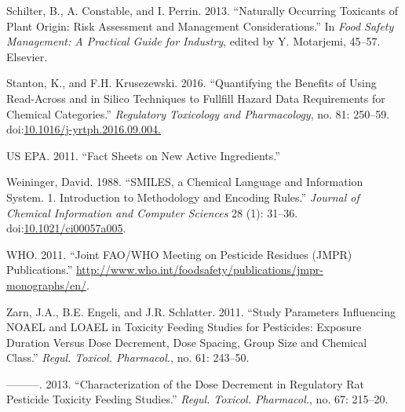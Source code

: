 \documentclass[]{achemso}
\begin{document}
\hypertarget{ref-Schilter2013}{}
Schilter, B., A. Constable, and I. Perrin. 2013. ``Naturally Occurring
Toxicants of Plant Origin: Risk Assessment and Management
Considerations.'' In \emph{Food Safety Management: A Practical Guide for
Industry}, edited by Y. Motarjemi, 45--57. Elsevier.

\hypertarget{ref-Stanton2016}{}
Stanton, K., and F.H. Krusezewski. 2016. ``Quantifying the Benefits of
Using Read-Across and in Silico Techniques to Fullfill Hazard Data
Requirements for Chemical Categories.'' \emph{Regulatory Toxicology and
Pharmacology}, no. 81: 250--59.
doi:\href{https://doi.org/10.1016/j-yrtph.2016.09.004.}{10.1016/j-yrtph.2016.09.004.}

\hypertarget{ref-EPA2011}{}
US EPA. 2011. ``Fact Sheets on New Active Ingredients.''

\hypertarget{ref-doi:10.1021ux2fci00057a005}{}
Weininger, David. 1988. ``SMILES, a Chemical Language and Information
System. 1. Introduction to Methodology and Encoding Rules.''
\emph{Journal of Chemical Information and Computer Sciences} 28 (1):
31--36.
doi:\href{https://doi.org/10.1021/ci00057a005}{10.1021/ci00057a005}.

\hypertarget{ref-WHO2011}{}
WHO. 2011. ``Joint FAO/WHO Meeting on Pesticide Residues (JMPR)
Publications.''
\url{http://www.who.int/foodsafety/publications/jmpr-monographs/en/}.

\hypertarget{ref-Zarn2011}{}
Zarn, J.A., B.E. Engeli, and J.R. Schlatter. 2011. ``Study Parameters
Influencing NOAEL and LOAEL in Toxicity Feeding Studies for Pesticides:
Exposure Duration Versus Dose Decrement, Dose Spacing, Group Size and
Chemical Class.'' \emph{Regul. Toxicol. Pharmacol.}, no. 61: 243--50.

\hypertarget{ref-Zarn2013}{}
---------. 2013. ``Characterization of the Dose Decrement in Regulatory
Rat Pesticide Toxicity Feeding Studies.'' \emph{Regul. Toxicol.
Pharmacol.}, no. 67: 215--20.
\end{document}
